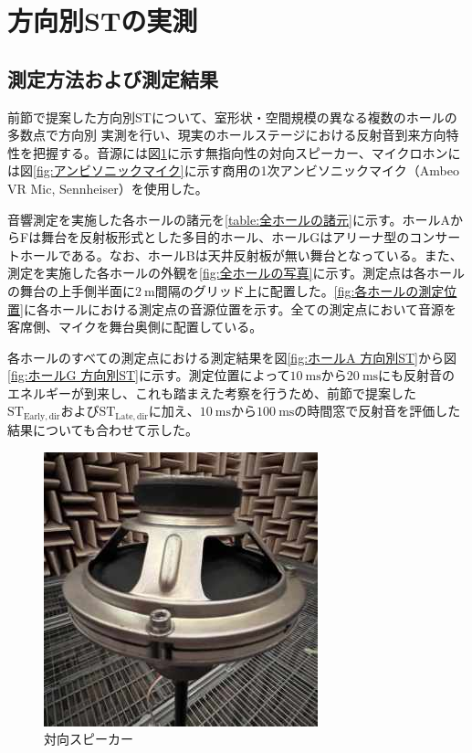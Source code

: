 \documentclass[11pt,a4j]{jreport}
\begin{document}
\section{方向別STの実測}

\subsection{測定方法および測定結果}
前節で提案した方向別STについて、室形状・空間規模の異なる複数のホールの多数点で方向別
実測を行い、現実のホールステージにおける反射音到来方向特性を把握する。音源には図\ref{fig:対向スピーカー}に示す無指向性の対向スピーカー、マイクロホンには図\ref{fig:アンビソニックマイク}に示す商用の1次アンビソニックマイク（Ambeo VR Mic, Sennheiser）を使用した。

音響測定を実施した各ホールの諸元を\ref{table:全ホールの諸元}に示す。ホールAからFは舞台を反射板形式とした多目的ホール、ホールGはアリーナ型のコンサートホールである。なお、ホールBは天井反射板が無い舞台となっている。また、測定を実施した各ホールの外観を\ref{fig:全ホールの写真}に示す。測定点は各ホールの舞台の上手側半面に$\SI{2}{\m}$間隔のグリッド上に配置した。\ref{fig:各ホールの測定位置}に各ホールにおける測定点の音源位置を示す。全ての測定点において音源を客席側、マイクを舞台奥側に配置している。

各ホールのすべての測定点における測定結果を図\ref{fig:ホールA 方向別ST}から図\ref{fig:ホールG 方向別ST}に示す。測定位置によって$\SI{10}{\ms}$から$\SI{20}{\ms}$にも反射音のエネルギーが到来し、これも踏まえた考察を行うため、前節で提案した$\mathrm{ST_{Early,dir}}$および$\mathrm{ST_{Late,dir}}$に加え、$\SI{10}{\ms}$から$\SI{100}{\ms}$の時間窓で反射音を評価した結果についても合わせて示した。
\\

\begin{figure}[H]
  \centering
  \includegraphics[width=.3\linewidth]{images/measuredHalls/opposedSpeaker.jpg}
  \caption{対向スピーカー}
  \label{fig:対向スピーカー}
\end{figure}
\end{document}
